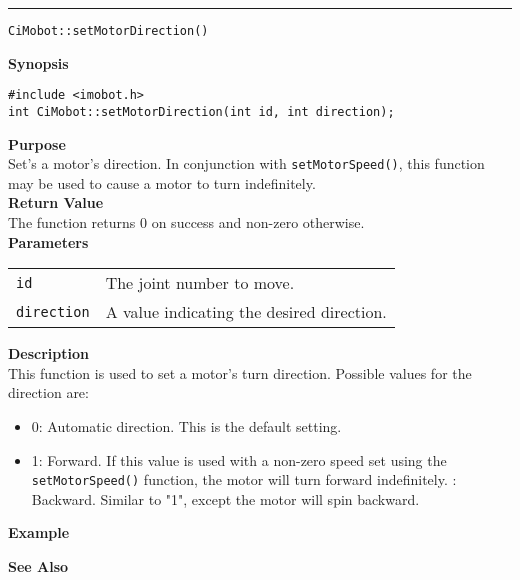 \noindent
\vspace{5pt}
\rule{6.5in}{0.015in}
\noindent
{\LARGE \texttt{CiMobot::setMotorDirection()}}\\
{}

\noindent
{\bf Synopsis}\\
\begin{verbatim}
#include <imobot.h>
int CiMobot::setMotorDirection(int id, int direction);
\end{verbatim}

\noindent
{\bf Purpose}\\
Set's a motor's direction. In conjunction with \texttt{setMotorSpeed()}, this
function may be used to cause a motor to turn indefinitely.\\

\noindent
{\bf Return Value}\\
The function returns 0 on success and non-zero otherwise.\\

\noindent
{\bf Parameters}
\vspace{-0.1in}
\begin{description}
\item               
\begin{tabular}{p{20 mm}p{145 mm}}
\texttt{id} & The joint number to move. \\
\texttt{direction} & A value indicating the desired direction.
\end{tabular}
\end{description}

\noindent
{\bf Description}\\
This function is used to set a motor's turn direction. Possible values for the
direction are:
\begin{itemize}
\item 0: Automatic direction. This is the default setting. 
\item 1: Forward. If this value is used with a non-zero speed set using the
\texttt{setMotorSpeed()} function, the motor will turn forward indefinitely.
: Backward. Similar to "1", except the motor will spin backward.
\end{itemize}

\noindent
{\bf Example}\\
\noindent

\noindent
{\bf See Also}\\

